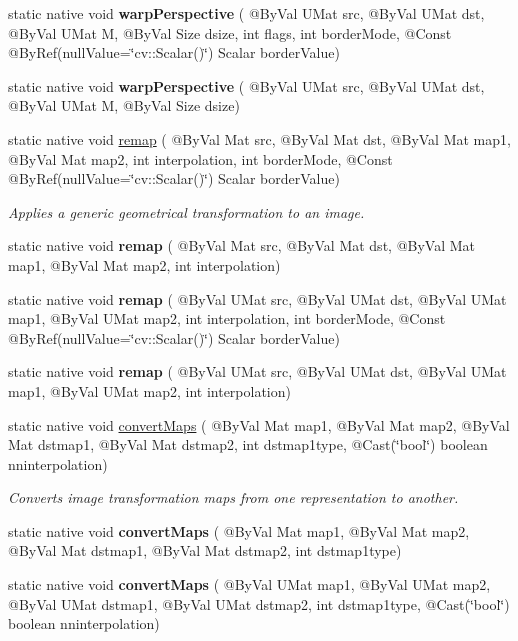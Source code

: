 \begin{DoxyCompactItemize}
\item 
static native void {\bfseries warp\+Perspective} ( @By\+Val U\+Mat src, @By\+Val U\+Mat dst, @By\+Val U\+Mat M, @By\+Val Size dsize, int flags, int border\+Mode, @Const @By\+Ref(null\+Value=\char`\"{}cv\+::\+Scalar()\char`\"{}) Scalar border\+Value)
\item 
static native void {\bfseries warp\+Perspective} ( @By\+Val U\+Mat src, @By\+Val U\+Mat dst, @By\+Val U\+Mat M, @By\+Val Size dsize)
\item 
static native void \hyperlink{group__imgproc__transform_gaa9d03105d426e5424af34452bee91554}{remap} ( @By\+Val Mat src, @By\+Val Mat dst, @By\+Val Mat map1, @By\+Val Mat map2, int interpolation, int border\+Mode, @Const @By\+Ref(null\+Value=\char`\"{}cv\+::\+Scalar()\char`\"{}) Scalar border\+Value)
\begin{DoxyCompactList}\small\item\em Applies a generic geometrical transformation to an image. \end{DoxyCompactList}\item 
static native void {\bfseries remap} ( @By\+Val Mat src, @By\+Val Mat dst, @By\+Val Mat map1, @By\+Val Mat map2, int interpolation)
\item 
static native void {\bfseries remap} ( @By\+Val U\+Mat src, @By\+Val U\+Mat dst, @By\+Val U\+Mat map1, @By\+Val U\+Mat map2, int interpolation, int border\+Mode, @Const @By\+Ref(null\+Value=\char`\"{}cv\+::\+Scalar()\char`\"{}) Scalar border\+Value)
\item 
static native void {\bfseries remap} ( @By\+Val U\+Mat src, @By\+Val U\+Mat dst, @By\+Val U\+Mat map1, @By\+Val U\+Mat map2, int interpolation)
\item 
static native void \hyperlink{group__imgproc__transform_ga5c40c7a1051387a05e1e30b6aaa6dbfd}{convert\+Maps} ( @By\+Val Mat map1, @By\+Val Mat map2, @By\+Val Mat dstmap1, @By\+Val Mat dstmap2, int dstmap1type, @Cast(\char`\"{}bool\char`\"{}) boolean nninterpolation)
\begin{DoxyCompactList}\small\item\em Converts image transformation maps from one representation to another. \end{DoxyCompactList}\item 
static native void {\bfseries convert\+Maps} ( @By\+Val Mat map1, @By\+Val Mat map2, @By\+Val Mat dstmap1, @By\+Val Mat dstmap2, int dstmap1type)
\item 
static native void {\bfseries convert\+Maps} ( @By\+Val U\+Mat map1, @By\+Val U\+Mat map2, @By\+Val U\+Mat dstmap1, @By\+Val U\+Mat dstmap2, int dstmap1type, @Cast(\char`\"{}bool\char`\"{}) boolean nninterpolation)

\end{DoxyCompactItemize}
